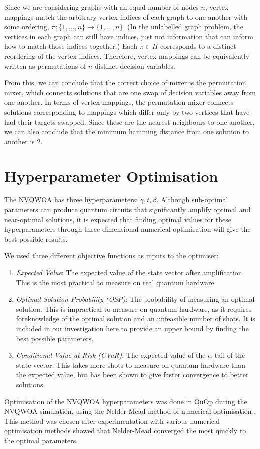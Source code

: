 Since we are considering graphs with an equal number of nodes $n$, vertex mappings match the arbitrary vertex indices of each graph to one another with some ordering, $\pi:\{1,...,n\}\to\{1,...,n\}$. (In the unlabelled graph problem, the vertices in each graph can still have indices, just not information that can inform how to match those indices together.) Each $\pi\in\Pi$ corresponds to a distinct reordering of the vertex indices. Therefore, vertex mappings can be equivalently written as permutations of $n$ distinct decision variables.

From this, we can conclude that the correct choice of mixer is the permutation mixer, which connects solutions that are one swap of decision variables away from one another. In terms of vertex mappings, the permutation mixer connects solutions corresponding to mappings which differ only by two vertices that have had their targets swapped. Since these are the nearest neighbours to one another, we can also conclude that the minimum hamming distance from one solution to another is 2.

\section{Hyperparameter Optimisation} \label{sec:parameters}
The NVQWOA has three hyperparameters: $\gamma, t, \beta$. Although sub-optimal parameters can produce quantum circuits that significantly amplify optimal and near-optimal solutions, it is expected that finding optimal values for these hyperparameters through three-dimensional numerical optimisation will give the best possible results.\cite{bennett2024analysisnonvariationalquantumwalkbased}
 
We used three different objective functions as inputs to the optimiser:
\begin{enumerate}
    \item \textit{Expected Value}: The expected value of the state vector after amplification. This is the most practical to measure on real quantum hardware.
    \item \textit{Optimal Solution Probability (OSP)}: The probability of measuring an optimal solution. This is impractical to measure on quantum hardware, as it requires foreknowledge of the optimal solution and an unfeasible number of shots. It is included in our investigation here to provide an upper bound by finding the best possible parameters.
    \item \textit{Conditional Value at Risk (CVaR)}: The expected value of the $\alpha$-tail of the state vector. This takes more shots to measure on quantum hardware than the expected value, but has been shown to give faster convergence to better solutions.\cite{CVaR_quantum}
\end{enumerate}
Optimisation of the NVQWOA hyperparameters was done in QuOp during the NVQWOA simulation, using the Nelder-Mead method of numerical optimisation \cite{nelder_mead}. This method was chosen after experimentation with various numerical optimisation methods showed that Nelder-Mead converged the most quickly to the optimal parameters.

